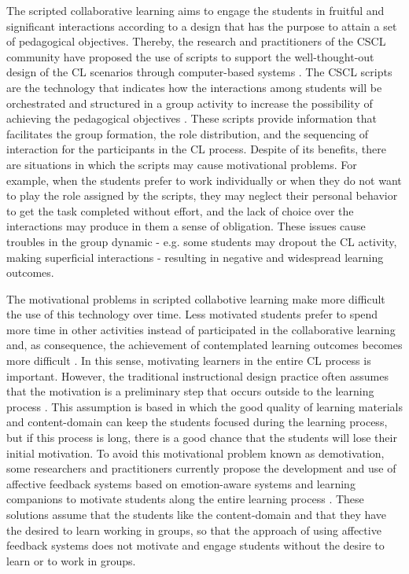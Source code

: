 The scripted collaborative learning aims to engage the students in fruitful and significant interactions according to a design that has the purpose to attain a set of pedagogical objectives.
Thereby, the research and practitioners of the CSCL community have proposed the use of scripts to support the well-thought-out design of the CL scenarios through computer-based systems \cite{FischerKollarStegmannWeckerZottmann2013,KobbeWeinbergerDillenbourgHarrerHamalainenHakkinenFischer2007}.
The CSCL scripts are the technology that indicates how the interactions among students will be orchestrated and structured in a group activity to increase the possibility of achieving the pedagogical objectives \cite{WeinbergerErtlFischerMandl2005}. These scripts provide information that facilitates the group formation, the role distribution, and the sequencing of interaction for the participants in the CL process.
Despite of its benefits, there are situations in which the scripts may cause motivational problems.
For example, when the students prefer to work individually or when they do not want to play the role assigned by the scripts, they may neglect their personal behavior to get the task completed without effort, and the lack of choice over the interactions may produce in them a sense of obligation.
These issues cause troubles in the group dynamic - e.g. some students may dropout the CL activity, making superficial interactions - resulting in negative and widespread learning outcomes.

The motivational problems in scripted collabotive learning make more difficult the use of this technology over time.
Less motivated students prefer to spend more time in other activities instead of participated in the collaborative learning and, as consequence, the achievement of contemplated learning outcomes becomes more difficult \cite{Crook2000, FaloutElwoodHood2009, SchoorBannert2011}.
In this sense, motivating learners in the entire CL process is important.
However, the traditional instructional design practice often assumes that the motivation is a preliminary step that occurs outside to the learning process \cite{ChanAhern1999, Keller1987}.
This assumption is based in which the good quality of learning materials and content-domain can keep the students focused during the learning process, but if this process is long, there is a good chance that the students will lose their initial motivation.
To avoid this motivational problem known as demotivation, some researchers and practitioners currently propose the development and use of affective feedback systems \cite{FeidakisDaradoumisCaballeConesa2014,FeidakisCaballeDaradoumisJimenezConesa2014} based on emotion-aware systems and learning companions to motivate students along the entire learning process \cite{WoolfBurlesonArroyoDragonCooperPicard2009}.
These solutions assume that the students like the content-domain and that they have the desired to learn working in groups, so that the approach of using affective feedback systems does not motivate and engage students without the desire to learn or to work in groups.

